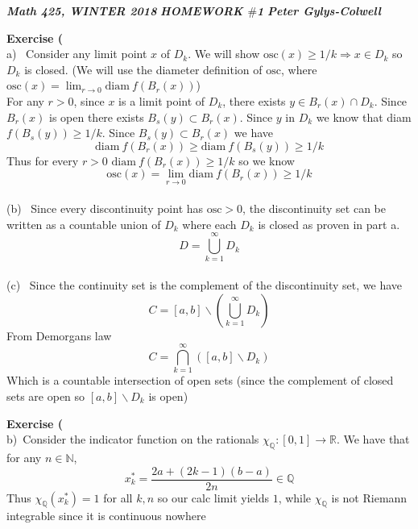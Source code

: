 \documentclass[12pt]{article}
\newenvironment{ques}[1]{\textbf{Exercise #1}\vspace{1 mm}\\ }{\bigskip}
\theoremstyle{definition}
\renewcommand{\l}{\left }
\renewcommand{\r}{\right }
\newcommand{\R}{\mathbb R}
\newcommand{\Q}{\mathbb Q}
\newcommand{\N}{\mathbb N}
\newcommand{\osc}{\text{osc}}
\newcommand{\diam}{\text{diam} \ }
\begin{document}
\noindent \textit{\textbf{Math 425, WINTER 2018}} \hspace{1.3cm}
\textit{\textbf{HOMEWORK $\#$1}} \hspace{1.3cm} \textit{\textbf{Peter
Gylys-Colwell}} 

\vspace{1cm}

\begin{ques}{19}
	(a) \ Consider any limit point $x$ of $D_k$. We will
	show $\osc(x) \geq 1/k \Rightarrow x \in D_k$ so $D_k$ is closed. (We will
	use the diameter definition of $\osc$, where $\osc(x) = \lim_{r \to 0}
	\diam f(B_r(x))$)\\
	For any $r > 0$, since $x$ is a limit point of $D_k$, there exists $y \in
	B_r(x) \cap D_k$. Since $B_r(x)$ is open there exists $B_s(y) \subset B_r(x)$.
	Since $y$ in $D_k$ we know that diam $f(B_s(y)) \geq 1/k$. Since $B_s(y)
	\subset B_r(x)$ we have 
	$$\diam f(B_r(x)) \geq \diam f(B_s(y)) \geq 1/k$$
	Thus for every $r > 0$ $\diam f(B_r(x)) \geq 1/k$ so we know 
	$$\osc(x) = \lim_{r \to 0} \diam f(B_r(x)) \geq 1/k$$
	\\
	(b) \ Since every discontinuity point has $\osc > 0$, the discontinuity set
	can be written as a countable union of $D_k$ where each $D_k$ is closed as
	proven in part a.
	$$D = \bigcup_{k=1}^\infty D_k$$
	\\
	(c) \ Since the continuity set is the complement of the discontinuity set,
	we have
	$$C = [a,b] \backslash \l(\bigcup_{k=1}^\infty D_k\r)$$
	From Demorgans law
	$$C = \bigcap_{k=1}^\infty\l( [a,b] \backslash D_k\r)$$
	Which is a countable intersection of open sets (since the complement of
	closed sets are open so $[a,b] \backslash D_k$ is open)
\end{ques}

\begin{ques}{27}
	(b)\ Consider the indicator function on the rationals $\chi_\Q: [0,1] \to
	\R$. We have that for any $n \in \N$, 
	$$x_k^* = \frac{2a + (2k -1)(b-a)}{2n} \in \Q$$ 
	Thus $\chi_\Q(x_k^*) = 1$ for all $k,n$ so our calc limit yields $1$, while
	$\chi_\Q$ is not Riemann integrable since it is continuous nowhere
\end{ques}
\end{document}
